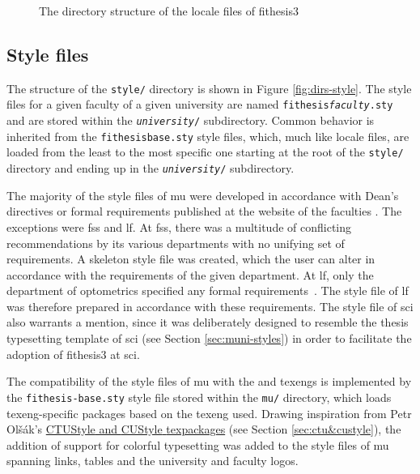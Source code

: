 \documentclass[digital,table,color]{fithesis3/fithesis3}
\begin{document}
  \begin{figure}
    \centering
    \parbox{0.5\textwidth}{}
    \caption{The directory structure of the locale files of
      \textsf{fithesis3}}
    \label{fig:dirs-locale}
  \end{figure}
  
  \subsection{Style files}\label{sec:dev-styles}
  The structure of the \texttt{style/} directory is shown in Figure
  \ref{fig:dirs-style}. The style files for a given faculty of a
  given university are named
  \texttt{fithesis\hyph{}\textit{faculty}.sty} and
  are stored within the \texttt{\textit{university}/}
  subdirectory. Common behavior is inherited from the
  \texttt{fithesis\hyph{}base.sty} style files,
  which, much like locale files, are loaded from the least to the
  most specific one starting at the root of the \texttt{style/}
  directory and ending up in the
  \texttt{\textit{university}/} subdirectory.

  The majority of the style files of \gls{mu} were developed in
  accordance with Dean's directives or formal requirements
  published at the website of the faculties \cite{ffdirective,
  peddirective,scidirective,lawdirective,fidirective,fspsdirective}.
  The exceptions were \gls{fss} and \gls{lf}. At \gls{fss}, there
  was a multitude of conflicting recommendations by its various
  departments with no unifying set of requirements. A skeleton
  style file was created, which the user can alter
  in accordance with the requirements of the given department. At
  \gls{lf}, only the department of optometrics specified any
  formal requirements~\cite{meddirective}. The style file of
  \gls{lf} was therefore prepared in accordance with these
  requirements. The style file of \gls{sci} also warrants a
  mention, since it was deliberately designed to resemble the
  thesis typesetting template of \gls{sci} (see Section
  \ref{sec:muni-styles}) in order to facilitate the adoption of
  \textsf{fithesis3} at \gls{sci}.
  
  The compatibility of the style files of \gls{mu} with the
   and  \glspl{texeng} is implemented
  by the \texttt{fithesis-base.sty} style file stored within the
  \texttt{mu/} directory, which loads \gls{texeng}-specific
  packages based on the \gls{texeng} used. Drawing inspiration
  from Petr Olšák's \hyperref[sec:ctu&custyle]{\textsf{CTUStyle}
   and
  \textsf{CUStyle} \glspl{texpackage}}
  (see Section \ref{sec:ctu&custyle}), the addition of support for
  colorful typesetting was added to the style files of \gls{mu}
  spanning links, tables and the university and faculty logos.
\end{document}
